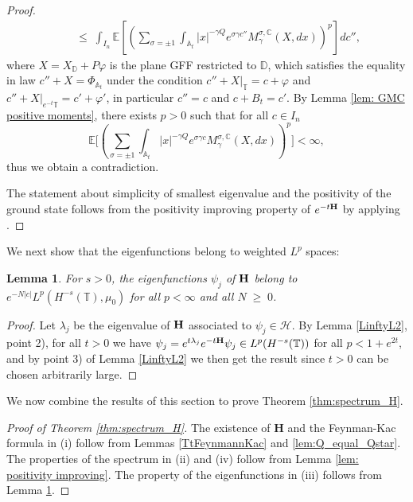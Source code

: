 \documentclass[11pt]{amsart}
\numberwithin{equation}{section}
\newtheorem{lemma}[theorem]{Lemma}
\theoremstyle{definition}
\renewcommand{\leq}{\;\leqslant\;}                   %
\renewcommand{\geq}{\;\geqslant\;}                   %
\newcommand{\A}{\mathbb{A}}
\newcommand{\D}{\mathbb{D}}
\def\E{\mathbb{E}}
\newcommand{\mc}{\mathcal}
\def\T{\mathbb{T}}
\begin{document}
\begin{proof}
\begin{align*}
& \quad \leq \int_{I_n}
\mathbb{E}\left[ \left(\sum_{\sigma = \pm 1} \int_{\mathbb{A}_t}|x|^{-\gamma Q} e^{\sigma \gamma c''} M_\gamma^{\sigma,\mathbb{C}}(X,dx) \right)^p\right]dc'', 
\end{align*}
where $X=X_\D+P\varphi$ is the plane GFF restricted to $\D$, which satisfies the equality in law $c''+X=\Phi_{\A_t}$ under the condition $c''+X|_{\T}=c+\varphi$ and $c''+X|_{e^{-t}\T}=c'+\varphi'$, in particular $c''=c$ and $c+B_t=c'$.
By Lemma \ref{lem: GMC positive moments}, there exists $p>0$ such that for all $c\in I_n$
\[ \E \Big[\left(\sum_{\sigma = \pm 1} \int_{\mathbb{A}_t}|x|^{-\gamma Q} e^{\sigma \gamma c} M_\gamma^{\sigma,\mathbb{C}}(X,dx) \right)^p\Big]<\infty,\] 
thus we obtain a contradiction.

The statement about simplicity of smallest eigenvalue and the positivity of the ground state follows from the positivity improving property of $e^{-t{\bf H}}$ by applying \cite[Theorem XIII.44]{Reed-Simon4}.
\end{proof}

We next show that the eigenfunctions belong to  weighted $L^p$ spaces:
\begin{lemma}\label{lem:eigenfunction_decay}
For $s>0$, the eigenfunctions $\psi_j$ of ${\bf H}$ belong to $e^{-N|c|}L^p(H^{-s}(\T),\mu_0)$ for all $p<\infty$ and all $N\geq 0$.
\end{lemma}
\begin{proof} Let $\lambda_j$ be the eigenvalue of ${\bf H}$ associated to $\psi_j\in \mc{H}$. By Lemma \ref{LinftyL2}, point 2), for all $t>0$ we have $\psi_j=e^{t\lambda_j} e^{-t{\bf H}}\psi_j\in L^p(H^{-s}(\T))$ for all $p<1+e^{2t}$, and by point 3) of Lemma \ref{LinftyL2} we then get the result since $t>0$ can be chosen arbitrarily large.
\end{proof}


We now combine the results of this section to prove Theorem \ref{thm:spectrum_H}.

\begin{proof}[Proof of Theorem \ref{thm:spectrum_H}]
The existence of $\mathbf{H}$ and the Feynman-Kac formula in (i) follow from Lemmas \ref{TtFeynmannKac} and \ref{lem:Q_equal_Qstar}. The properties of the spectrum in (ii) and (iv) follow from Lemma \ref{lem: positivity improving}. The property of the eigenfunctions in (iii) follows from Lemma \ref{lem:eigenfunction_decay}.
\end{proof}
\end{document}
